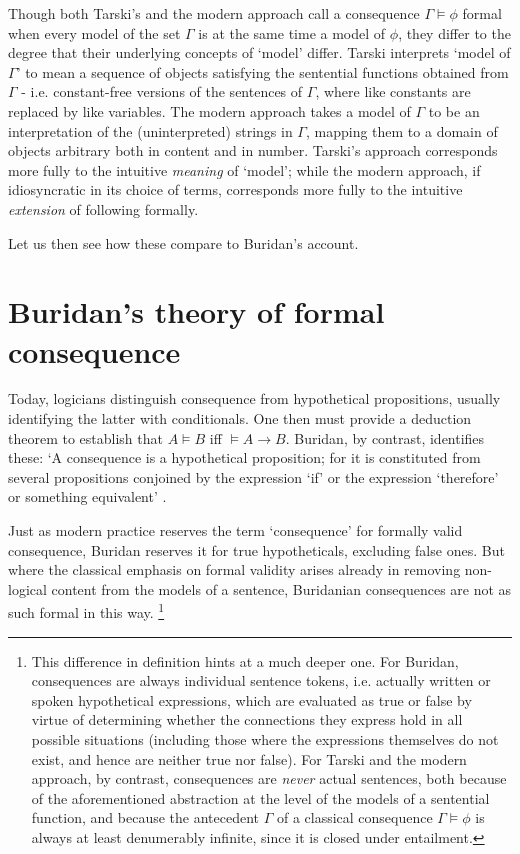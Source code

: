 \documentclass[]{article}
\begin{document}
Though both Tarski's and the modern approach call a consequence $\Gamma \models \phi$ formal when every model of the set $\Gamma$ is at the same time a model of $\phi$, they differ to the degree that their underlying concepts of `model' differ. Tarski interprets `model of $\Gamma$' to mean a sequence of objects satisfying the sentential functions obtained from $\Gamma$ - i.e. constant-free versions of the sentences of $\Gamma$, where like constants are replaced by like variables. The modern approach takes a model of $\Gamma$ to be an interpretation of the (uninterpreted) strings in $\Gamma$, mapping them to a domain of objects arbitrary both in content and in number. Tarski's approach corresponds more fully to the intuitive \textit{meaning} of `model'; while the modern approach, if idiosyncratic in its choice of terms, corresponds more fully to the intuitive \textit{extension} of following formally. 

Let us then see how these compare to Buridan's account.
\section{Buridan's theory of formal consequence}
Today, logicians distinguish consequence from hypothetical propositions, usually identifying the latter with conditionals. One then must provide a deduction theorem to establish that $A \models B$ iff $\models A \rightarrow B$. Buridan, by contrast, identifies these: `A consequence is a hypothetical proposition; for it is constituted from several propositions conjoined by the expression `if' or the expression `therefore' or something equivalent' \autocite[I. 3, 66, alt.]{Buridan2015}. 

Just as modern practice reserves the term `consequence' for formally valid consequence, Buridan reserves it for true hypotheticals, excluding false ones\autocite[I. 3, 66]{Buridan2015}. But where the classical emphasis on formal validity arises already in removing non-logical content from the models of a sentence, Buridanian consequences are not as such formal in this way. \footnote{This difference in definition hints at a much deeper one. For Buridan, consequences are always individual sentence tokens, i.e. actually written or spoken hypothetical expressions, which are evaluated as true or false by virtue of determining whether the connections they express hold in all possible situations (including those where the expressions themselves do not exist, and hence are neither true nor false). For Tarski and the modern approach, by contrast, consequences are \textit{never} actual sentences, both because of the aforementioned abstraction at the level of the models of a sentential function, and because the antecedent $\Gamma$ of a classical consequence $\Gamma \models \phi$ is always at least denumerably infinite, since it is closed under entailment.}
\end{document}
